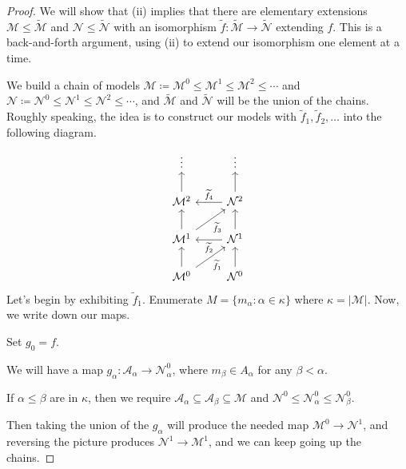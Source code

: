 \documentclass[../notes.tex]{subfiles}
\begin{document}
\begin{proof}
	We will show that (ii) implies that there are elementary extensions $\mathcal M\le\widetilde{\mathcal M}$ and $\mathcal N\le\widetilde{\mathcal N}$ with an isomorphism $\widetilde f\colon\widetilde{\mathcal M}\to\widetilde{\mathcal N}$ extending $f$. This is a back-and-forth argument, using (ii) to extend our isomorphism one element at a time.

	We build a chain of models $\mathcal M\coloneqq\mathcal M^0\le\mathcal M^1\le\mathcal M^2\le\cdots$ and $\mathcal N\coloneqq\mathcal N^0\le\mathcal N^1\le\mathcal N^2\le\cdots$, and $\widetilde{\mathcal M}$ and $\widetilde{\mathcal N}$ will be the union of the chains. Roughly speaking, the idea is to construct our models with $\widetilde f_1,\widetilde f_2,\ldots$ into the following diagram.
	\begin{equation}
		\begin{tikzcd}
			\vdots & \vdots \\
			{\mathcal M^2} & {\mathcal N^2} \\
			{\mathcal M^1} & {\mathcal N^1} \\
			{\mathcal M^0} & {\mathcal N^0}
			\arrow["{\widetilde f_1}"', from=4-1, to=3-2]
			\arrow["{\widetilde f_2}", from=3-2, to=3-1]
			\arrow["{\widetilde f_3}"', from=3-1, to=2-2]
			\arrow["{\widetilde f_4}"', from=2-2, to=2-1]
			\arrow[from=4-1, to=3-1]
			\arrow[from=3-1, to=2-1]
			\arrow[from=2-1, to=1-1]
			\arrow[from=4-2, to=3-2]
			\arrow[from=3-2, to=2-2]
			\arrow[from=2-2, to=1-2]
		\end{tikzcd} \label{eq:go-up-chains}
	\end{equation}
	Let's begin by exhibiting $\widetilde f_1$. Enumerate $M=\{m_\alpha:\alpha\in\kappa\}$ where $\kappa=\left|\mathcal M\right|$. Now, we write down our maps.
	\begin{listalph}
		\item Set $g_0=f$.
		\item We will have a map $g_\alpha\colon\mathcal A_\alpha\to\mathcal N^0_{\alpha}$, where $m_\beta\in A_\alpha$ for any $\beta<\alpha$.
		\item If $\alpha\le\beta$ are in $\kappa$, then we require $\mathcal A_\alpha\subseteq\mathcal A_\beta\subseteq\mathcal M$ and $\mathcal N^0\le\mathcal N^0_{\alpha}\le\mathcal N^0_\beta$.
	\end{listalph}
	Then taking the union of the $g_\alpha$ will produce the needed map $\mathcal M^0\to\mathcal N^1$, and reversing the picture produces $\mathcal N^1\to\mathcal M^1$, and we can keep going up the chains.


\end{proof}
\end{document}
